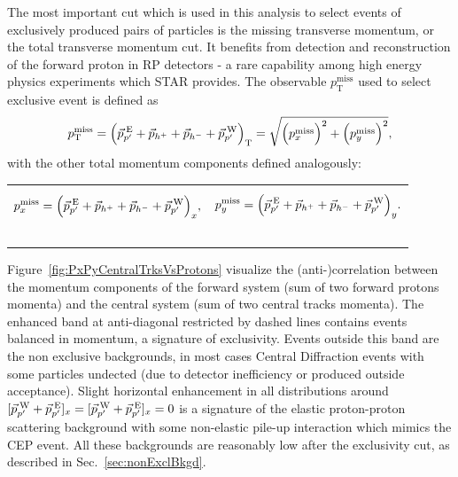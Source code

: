 The most important cut which is used in this analysis to select events of exclusively produced pairs of particles is the missing transverse momentum, or the total transverse momentum cut. It benefits from detection and reconstruction of the forward proton in RP detectors - a rare capability among high energy physics experiments which STAR provides. The observable $p_{\text{T}}^{\text{miss}}$ used to select exclusive event is defined as
\begin{equation}\label{eq:missingPt}
 p_{\text{T}}^{\text{miss}} = \Big( \vec{p}_{p'}^{\hspace*{2pt}\text{E}} + \vec{p}_{h^{+}} + \vec{p}_{h^{-}} + \vec{p}_{p'}^{\hspace*{2pt}\text{W}} \Big)_{\text{T}} = \sqrt{\Big(p_{x}^{\text{miss}}\Big)^{2} + \Big(p_{y}^{\text{miss}}\Big)^{2}},
\end{equation}
with the other total momentum components defined analogously:\\
\begin{tabulary}{\textwidth}{LL}
\begin{equation}\label{eq:missingPx}
 p_{x}^{\text{miss}} = \Big( \vec{p}_{p'}^{\hspace*{2pt}\text{E}} + \vec{p}_{h^{+}} + \vec{p}_{h^{-}} + \vec{p}_{p'}^{\hspace*{2pt}\text{W}} \Big)_{x},
\end{equation}~~~~~~~~~~~~~~~~~~~~~
&
\begin{equation}\label{eq:missingPy}
 p_{y}^{\text{miss}} = \Big( \vec{p}_{p'}^{\hspace*{2pt}\text{E}} + \vec{p}_{h^{+}} + \vec{p}_{h^{-}} + \vec{p}_{p'}^{\hspace*{2pt}\text{W}} \Big)_{y}.
\end{equation}~~~~~~~~~~~~~~~~~~~~~
\end{tabulary}


Figure~\ref{fig:PxPyCentralTrksVsProtons} visualize the (anti-)correlation between the momentum components of the forward system (sum of two forward protons momenta) and the central system (sum of two central tracks momenta). The enhanced band at anti-diagonal restricted by dashed lines contains events balanced in momentum, a signature of exclusivity. Events outside this band are the non exclusive backgrounds, in most cases Central Diffraction events with some particles undected (due to detector inefficiency or produced outside acceptance). Slight horizontal enhancement in all distributions around $[\vec{p}^{\hspace*{2pt}\text{W}}_{p'}+\vec{p}^{\hspace*{2pt}\text{E}}_{p'}]_{x} = [\vec{p}^{\hspace*{2pt}\text{W}}_{p'}+\vec{p}^{\hspace*{2pt}\text{E}}_{p'}]_{x} =0$ is a signature of the elastic proton-proton scattering background with some non-elastic pile-up interaction which mimics the CEP event. All these backgrounds are reasonably low after the exclusivity cut, as described in Sec.~\ref{sec:nonExclBkgd}.


